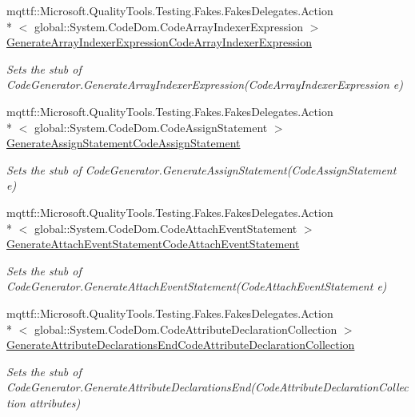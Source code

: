 \begin{DoxyCompactItemize}
mqttf\-::\-Microsoft.\-Quality\-Tools.\-Testing.\-Fakes.\-Fakes\-Delegates.\-Action\\*
$<$ global\-::\-System.\-Code\-Dom.\-Code\-Array\-Indexer\-Expression $>$ \hyperlink{class_system_1_1_code_dom_1_1_compiler_1_1_fakes_1_1_stub_code_compiler_a91eea73c2927de83553395c38cbfbe39}{Generate\-Array\-Indexer\-Expression\-Code\-Array\-Indexer\-Expression}
\begin{DoxyCompactList}\small\item\em Sets the stub of Code\-Generator.\-Generate\-Array\-Indexer\-Expression(\-Code\-Array\-Indexer\-Expression e)\end{DoxyCompactList}\item 
mqttf\-::\-Microsoft.\-Quality\-Tools.\-Testing.\-Fakes.\-Fakes\-Delegates.\-Action\\*
$<$ global\-::\-System.\-Code\-Dom.\-Code\-Assign\-Statement $>$ \hyperlink{class_system_1_1_code_dom_1_1_compiler_1_1_fakes_1_1_stub_code_compiler_a1dd918dcededb2e60b99aa4370d58f37}{Generate\-Assign\-Statement\-Code\-Assign\-Statement}
\begin{DoxyCompactList}\small\item\em Sets the stub of Code\-Generator.\-Generate\-Assign\-Statement(\-Code\-Assign\-Statement e)\end{DoxyCompactList}\item 
mqttf\-::\-Microsoft.\-Quality\-Tools.\-Testing.\-Fakes.\-Fakes\-Delegates.\-Action\\*
$<$ global\-::\-System.\-Code\-Dom.\-Code\-Attach\-Event\-Statement $>$ \hyperlink{class_system_1_1_code_dom_1_1_compiler_1_1_fakes_1_1_stub_code_compiler_a8ce1e95b3776caef8afa6fa1fc0305f7}{Generate\-Attach\-Event\-Statement\-Code\-Attach\-Event\-Statement}
\begin{DoxyCompactList}\small\item\em Sets the stub of Code\-Generator.\-Generate\-Attach\-Event\-Statement(\-Code\-Attach\-Event\-Statement e)\end{DoxyCompactList}\item 
mqttf\-::\-Microsoft.\-Quality\-Tools.\-Testing.\-Fakes.\-Fakes\-Delegates.\-Action\\*
$<$ global\-::\-System.\-Code\-Dom.\-Code\-Attribute\-Declaration\-Collection $>$ \hyperlink{class_system_1_1_code_dom_1_1_compiler_1_1_fakes_1_1_stub_code_compiler_ae0dd577038eb1d6c9e40aec1ef7c3bea}{Generate\-Attribute\-Declarations\-End\-Code\-Attribute\-Declaration\-Collection}
\begin{DoxyCompactList}\small\item\em Sets the stub of Code\-Generator.\-Generate\-Attribute\-Declarations\-End(\-Code\-Attribute\-Declaration\-Collection attributes)\end{DoxyCompactList}\item 

\end{DoxyCompactItemize}
